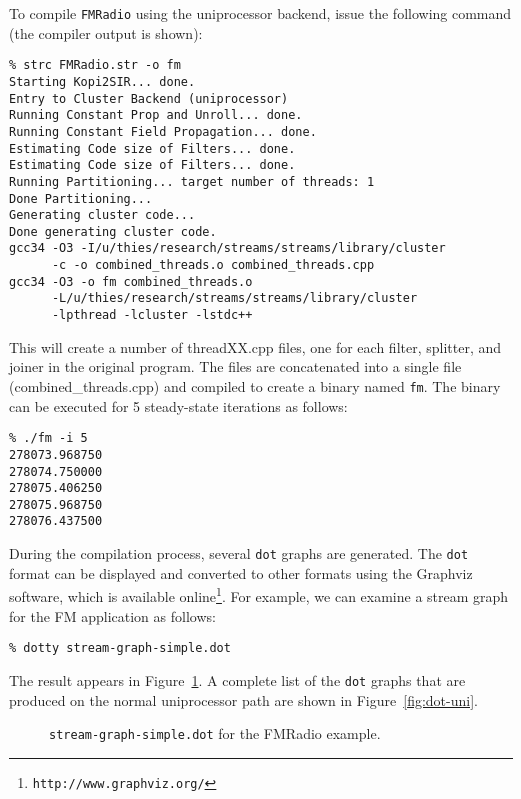 To compile {\tt FMRadio} using the uniprocessor backend, issue the
following command (the compiler output is shown): 
{\small
\begin{verbatim}
% strc FMRadio.str -o fm
Starting Kopi2SIR... done.
Entry to Cluster Backend (uniprocessor)
Running Constant Prop and Unroll... done.
Running Constant Field Propagation... done.
Estimating Code size of Filters... done.
Estimating Code size of Filters... done.
Running Partitioning... target number of threads: 1
Done Partitioning...
Generating cluster code...
Done generating cluster code.
gcc34 -O3 -I/u/thies/research/streams/streams/library/cluster 
      -c -o combined_threads.o combined_threads.cpp
gcc34 -O3 -o fm combined_threads.o 
      -L/u/thies/research/streams/streams/library/cluster 
      -lpthread -lcluster -lstdc++
\end{verbatim}
}
This will create a number of threadXX.cpp files, one for each filter,
splitter, and joiner in the original program.  The files are
concatenated into a single file (combined\_threads.cpp) and compiled to
create a binary named {\tt fm}.  The binary can be executed for 5
steady-state iterations as follows: 
{\small
\begin{verbatim}
% ./fm -i 5
278073.968750
278074.750000
278075.406250
278075.968750
278076.437500
\end{verbatim}
} 
During the compilation process, several {\tt dot} graphs are
generated.  The {\tt dot} format can be displayed and converted to
other formats using the Graphviz software, which is available
online\footnote{\tt http://www.graphviz.org/}.
For example, we can examine a stream graph for the FM application as
follows: {\small
\begin{verbatim}
% dotty stream-graph-simple.dot
\end{verbatim}
} 
The result appears in Figure~\ref{fig:fm-sir-tree}.  A complete list
of the {\tt dot} graphs that are produced on the normal uniprocessor
path are shown in Figure~\ref{fig:dot-uni}.

\begin{figure}[t]
\hspace{-0.75in}
\caption{{\tt stream-graph-simple.dot} for the FMRadio example.\protect\label{fig:fm-sir-tree}}
\end{figure}

